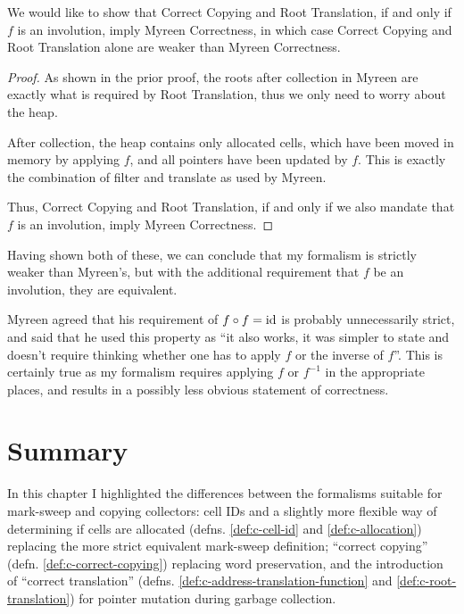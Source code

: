 \begin{theorem}
  We would like to show that Correct Copying and Root Translation, if
  and only if $f$ is an involution, imply Myreen Correctness, in which
  case Correct Copying and Root Translation alone are weaker than
  Myreen Correctness.

  \begin{proof}
    As shown in the prior proof, the roots after collection in Myreen
    are exactly what is required by Root Translation, thus we only
    need to worry about the heap.

    After collection, the heap contains only allocated cells, which
    have been moved in memory by applying $f$, and all pointers have
    been updated by $f$. This is exactly the combination of filter and
    translate as used by Myreen.

    Thus, Correct Copying and Root Translation, if and only if we also
    mandate that $f$ is an involution, imply Myreen Correctness.
  \end{proof}
\end{theorem}

Having shown both of these, we can conclude that my formalism is
strictly weaker than Myreen's, but with the additional requirement
that $f$ be an involution, they are equivalent.

Myreen\cite{MyreenEmail} agreed that his requirement of $f \circ f =
\mathrm{id}$ is probably unnecessarily strict, and said that he used this
property as ``it also works, it was simpler to state and doesn't
require thinking whether one has to apply $f$ or the inverse of
$f$''. This is certainly true as my formalism requires applying $f$ or
$f^{-1}$ in the appropriate places, and results in a possibly less
obvious statement of correctness.

\section{Summary}
\label{sec:copying-summary}

In this chapter I highlighted the differences between the formalisms
suitable for mark-sweep and copying collectors:
cell IDs and a slightly more flexible way of determining if cells are
allocated (defns. \ref{def:c-cell-id} and \ref{def:c-allocation})
replacing the more strict equivalent mark-sweep definition; ``correct
copying'' (defn. \ref{def:c-correct-copying}) replacing word
preservation, and the introduction of ``correct translation''
(defns. \ref{def:c-address-translation-function} and
\ref{def:c-root-translation}) for pointer mutation during
garbage collection.

